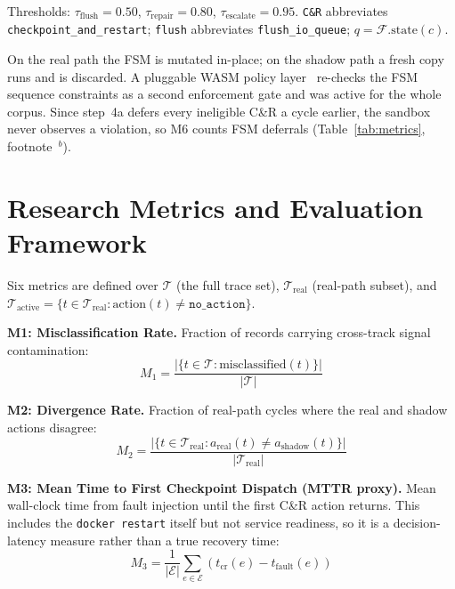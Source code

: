 \documentclass[conference]{IEEEtran}
\begin{document}
Thresholds: $\tau_{\mathrm{flush}} = 0.50$, $\tau_{\mathrm{repair}} = 0.80$, $\tau_{\mathrm{escalate}} = 0.95$. \texttt{C\&R} abbreviates \texttt{checkpoint\_and\_restart}; \texttt{flush} abbreviates \texttt{flush\_io\_queue}; $q = \mathcal{F}.\mathrm{state}(c)$.

On the real path the FSM is mutated in-place; on the shadow path a fresh copy runs and is discarded. A pluggable WASM policy layer~\cite{b4} re-checks the FSM sequence constraints as a second enforcement gate and was active for the whole corpus. Since step~4a defers every ineligible C\&R a cycle earlier, the sandbox never observes a violation, so M6 counts FSM deferrals (Table~\ref{tab:metrics}, footnote~$^{b}$).

\section{Research Metrics and Evaluation Framework}
\label{sec:metrics}

Six metrics are defined over $\mathcal{T}$ (the full trace set), $\mathcal{T}_{\mathrm{real}}$ (real-path subset), and $\mathcal{T}_{\mathrm{active}} = \{t \in \mathcal{T}_{\mathrm{real}} : \mathrm{action}(t) \neq \texttt{no\_action}\}$.

\textbf{M1: Misclassification Rate.} Fraction of records carrying cross-track signal contamination:
\begin{equation}
M_1 = \frac{|\{t \in \mathcal{T} : \mathrm{misclassified}(t)\}|}{|\mathcal{T}|}
\label{eq:M1}
\end{equation}

\textbf{M2: Divergence Rate.} Fraction of real-path cycles where the real and shadow actions disagree:
\begin{equation}
M_2 = \frac{|\{t \in \mathcal{T}_{\mathrm{real}} : a_{\mathrm{real}}(t) \neq a_{\mathrm{shadow}}(t)\}|}{|\mathcal{T}_{\mathrm{real}}|}
\label{eq:M2}
\end{equation}

\textbf{M3: Mean Time to First Checkpoint Dispatch (MTTR proxy).} Mean wall-clock time from fault injection until the first C\&R action returns. This includes the \texttt{docker restart} itself but not service readiness, so it is a decision-latency measure rather than a true recovery time:
\begin{equation}
M_3 = \frac{1}{|\mathcal{E}|} \sum_{e \in \mathcal{E}} \!\left(t_{\mathrm{cr}}(e) - t_{\mathrm{fault}}(e)\right)
\label{eq:M3}
\end{equation}
\end{document}
